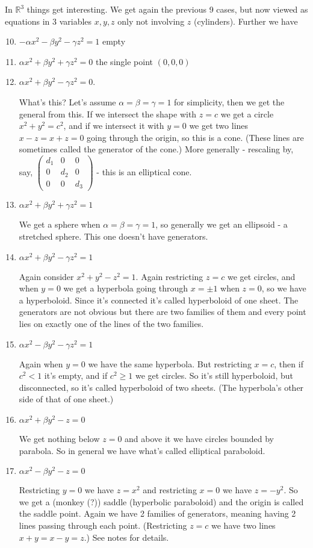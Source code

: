 \documentclass[a4paper]{article}
\theoremstyle{definition}
\begin{document}
In $\mathbb R^3$ things get interesting. We get again the previous 9 cases, but now viewed as equations in 3 variables $x,y,z$ only not involving $z$ (cylinders). Further we have
\begin{enumerate}
    \setcounter{enumi}{9}
    \item $-\alpha x^2-\beta y^2-\gamma z^2=1$ \qquad empty
    \item $\alpha x^2+\beta y^2+\gamma z^2=0$ \qquad the single point $(0,0,0)$
    \item $\alpha x^2 + \beta y^2 - \gamma z^2=0$.
    
    What's this? Let's assume $\alpha=\beta=\gamma=1$ for simplicity, then we get the general from this. If we intersect the shape with $z=c$ we get a circle $x^2+y^2=c^2$, and if we intersect it with $y=0$ we get two lines $x-z=x+z=0$ going through the origin, so this is a cone. (These lines are sometimes called the generator of the cone.) More generally - rescaling by, say, $\begin{pmatrix}
    d_1 & 0 & 0 \\ 0 & d_2 & 0 \\ 0 & 0 & d_3
    \end{pmatrix}$ - this is an elliptical cone.
    \item $\alpha x^2+\beta y^2+\gamma z^2=1$
    
    We get a sphere when $\alpha=\beta=\gamma=1$, so generally we get an ellipsoid - a stretched sphere. This one doesn't have generators.
    \item $\alpha x^2+\beta y^2-\gamma z^2=1$
    
    Again consider $x^2+y^2-z^2=1$. Again restricting $z=c$ we get circles, and when $y=0$ we get a hyperbola going through $x=\pm 1$ when $z=0$, so we have a hyperboloid. Since it's connected it's called hyperboloid of one sheet. The generators are not obvious but there are two families of them and every point lies on exactly one of the lines of the two families.
    
    \item $\alpha x^2-\beta y^2-\gamma z^2=1$
    
    Again when $y=0$ we have the same hyperbola. But restricting $x=c$, then if $c^2< 1$ it's empty, and if $c^2\geq 1$ we get circles. So it's still hyperboloid, but disconnected, so it's called hyperboloid of two sheets. (The hyperbola's other side of that of one sheet.)
    \item $\alpha x^2+\beta y^2-z=0$
    
    We get nothing below $z=0$ and above it we have circles bounded by parabola. So in general we have what's called elliptical paraboloid.
    
    \item $\alpha x^2-\beta y^2-z=0$
    
    Restricting $y=0$ we have $z=x^2$ and restricting $x=0$ we have $z=-y^2$. So we get a (monkey (?)) saddle (hyperbolic paraboloid) and the origin is called the saddle point. Again we have 2 families of generators, meaning having 2 lines passing through each point. (Restricting $z=c$ we have two lines $x+y=x-y=z.$) See notes for details.
\end{enumerate}
\end{document}
